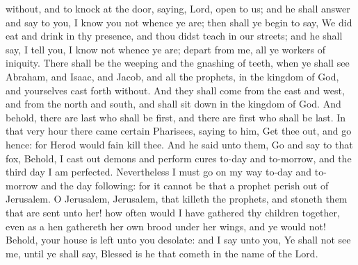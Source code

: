 without, and to knock at the door, saying, Lord, open to us; and he shall answer and say to you, I know you not whence ye are; then shall ye begin to say, We did eat and drink in thy presence, and thou didst teach in our streets; and he shall say, I tell you, I know not whence ye are; depart from me, all ye workers of iniquity. There shall be the weeping and the gnashing of teeth, when ye shall see Abraham, and Isaac, and Jacob, and all the prophets, in the kingdom of God, and yourselves cast forth without. And they shall come from the east and west, and from the north and south, and shall sit down in the kingdom of God. And behold, there are last who shall be first, and there are first who shall be last.  In that very hour there came certain Pharisees, saying to him, Get thee out, and go hence: for Herod would fain kill thee. And he said unto them, Go and say to that fox, Behold, I cast out demons and perform cures to-day and to-morrow, and the third day I am perfected. Nevertheless I must go on my way to-day and to-morrow and the day following: for it cannot be that a prophet perish out of Jerusalem. O Jerusalem, Jerusalem, that killeth the prophets, and stoneth them that are sent unto her! how often would I have gathered thy children together, even as a hen gathereth her own brood under her wings, and ye would not! Behold, your house is left unto you desolate: and I say unto you, Ye shall not see me, until ye shall say, Blessed is he that cometh in the name of the Lord. 

